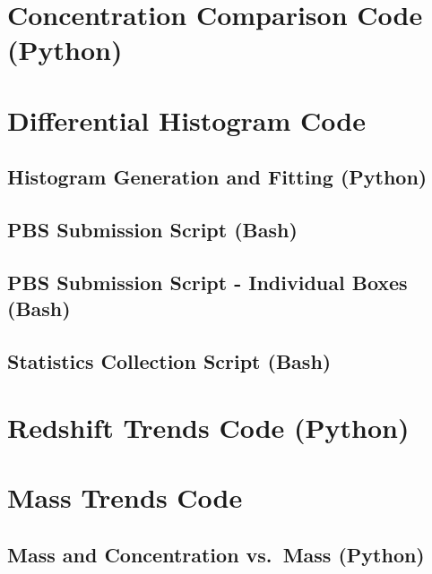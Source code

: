 \documentclass[12pt]{report}
\begin{document}
\begin{appendices}
	\chapter{Concentration Comparison Code (Python)}
	\label{app:concentration_comparison}
	

	\chapter{Differential Histogram Code}
	\label{app:diff_hist}
	\section{Histogram Generation and Fitting (Python)}
	\label{app:hist}
	
	\section{PBS Submission Script (Bash)}
	\label{app:run_diff_hist}
	
	\section{PBS Submission Script - Individual Boxes (Bash)}
	\label{app:run_diff_hist_individual_boxes}
	
	\section{Statistics Collection Script (Bash)}
	\label{app:collect_stats}
	

	\chapter{Redshift Trends Code (Python)}
	\label{app:redshift_trends}
	

	\chapter{Mass Trends Code}
	\label{app:mass_trends}
	\section{Mass and Concentration vs.\ Mass (Python)}
	\label{app:mass_trends_mass}
	

\end{appendices}
\end{document}
